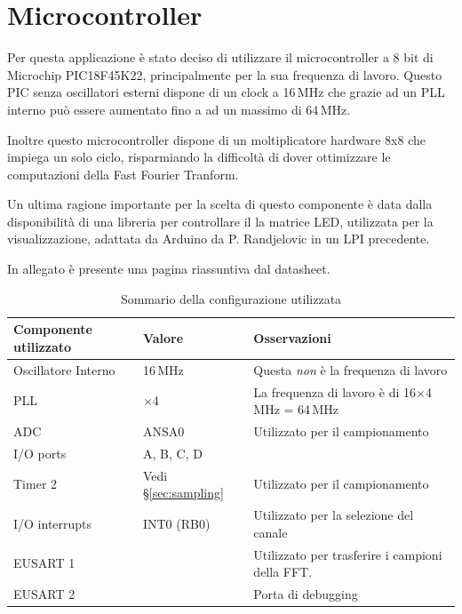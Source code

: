 \section{Microcontroller}
Per questa applicazione \`e stato deciso di utilizzare il microcontroller a 8
bit di Microchip PIC18F45K22, principalmente per la sua frequenza di lavoro.
Questo PIC senza oscillatori esterni dispone di un clock a 16\,MHz che grazie
ad un PLL interno pu\`o essere aumentato fino a ad un massimo di 64\,MHz.

Inoltre questo microcontroller dispone di un moltiplicatore hardware 8x8 che
impiega un solo ciclo, risparmiando la difficolt\`a di dover ottimizzare le
computazioni della Fast Fourier Tranform.

Un ultima ragione importante per la scelta di questo componente \`e data dalla
disponibilit\`a di una libreria per controllare il la matrice LED, utilizzata
per la visualizzazione, adattata da Arduino da P. Randjelovic in un LPI
precedente.

In allegato \`e presente una pagina riassuntiva dal datasheet.

\begin{table}[H] \centering
    \caption{Sommario della configurazione utilizzata}
    \begin{tabularx}{\textwidth}{l l X}
        \toprule
        \bfseries Componente utilizzato & \bfseries Valore & \bfseries Osservazioni \\
        \midrule
        Oscillatore Interno & 16\,MHz & 
            Questa \emph{non} \`e la frequenza di lavoro \\
        PLL & \(\times\)4 & 
            La frequenza di lavoro \`e di 16\(\times\)4\,MHz = 64\,MHz \\
        ADC & \ttfamily ANSA0 &
            Utilizzato per il campionamento \\
        I/O ports & \ttfamily A, B, C, D & \\
        Timer 2 & Vedi \S\ref{sec:sampling} & Utilizzato per il campionamento \\
        I/O interrupts & \ttfamily INT0 (RB0) &
            Utilizzato per la selezione del canale \\
        EUSART 1 & & 
            Utilizzato per trasferire i campioni della FFT. \\
        EUSART 2 & &
            Porta di debugging \\
        \bottomrule
    \end{tabularx}
\end{table}

